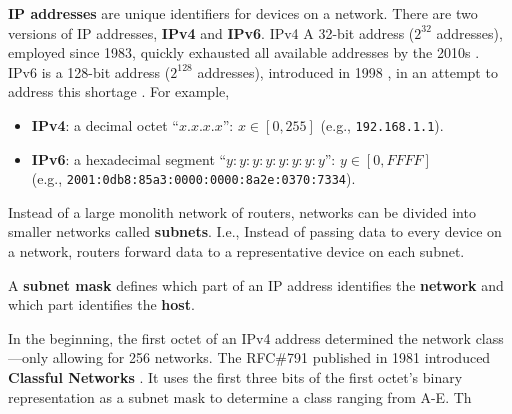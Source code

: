 \begin{Def}[IP Addressing]

    \textbf{IP addresses} are unique identifiers for devices on a network. 
    There are two versions of IP addresses, \textbf{IPv4} and \textbf{IPv6}.
    IPv4 A 32-bit address ($2^{32}$ addresses), employed since 1983, quickly exhausted all available addresses by the 2010s \cite{info12060246}.
    IPv6 is a 128-bit address ($2^{128}$ addresses), introduced in 1998 , in an attempt to address this shortage \cite{deering_ipv6_specification}\cite{ibm_ipv4_ipv6_formats}.
    For example,
    \begin{itemize}
        \item \textbf{IPv4}: a decimal octet ``$x.x.x.x$'': $x \in [0, 255]$ (e.g., \texttt{192.168.1.1}).
        \item \textbf{IPv6}: a hexadecimal segment ``$y:y:y:y:y:y:y:y$'': $y\in [0, FFFF]$ \\
         (e.g., \texttt{2001:0db8:85a3:0000:0000:8a2e:0370:7334}).
    \end{itemize}
\end{Def}

\newpage

\begin{Def}[Subnetting]

    Instead of a large monolith network of routers, networks can be divided into 
    smaller networks called \textbf{subnets}. I.e., Instead of passing data to every device on a network, routers forward data to a representative device on each subnet.
    \hfill \cite{cloudflare_subnet}
\end{Def}
\begin{Def}

    A \textbf{subnet mask} defines which part of an IP address identifies the \textbf{network} and which part identifies the \textbf{host}.
\end{Def}
\begin{Def}

    In the beginning, the first octet of an IPv4 address determined the network class---only allowing for 256 networks.
    The RFC\#791 published in 1981 introduced \textbf{Classful Networks} \cite{postel_internet_protocol}. 
    It uses the first three bits of the first octet's binary representation as a subnet mask to determine a class ranging from A-E.
    Th
\end{Def}

